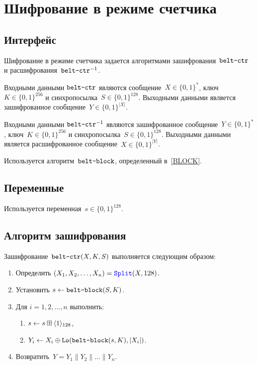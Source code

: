 \section{Шифрование в режиме счетчика}\label{CTR}

\subsection{Интерфейс}\label{CTR.IFace}

Шифрование в режиме счетчика задается алгоритмами 
зашифрования~$\texttt{belt-ctr}$ и расшифрования~$\texttt{belt-ctr}^{-1}$.

Входными данными $\texttt{belt-ctr}$ являются сообщение~$X\in\{0,1\}^*$, 
ключ~$K\in\{0,1\}^{256}$ и синхропосылка~$S\in\{0,1\}^{128}$.
%
Выходными данными является зашифрованное сообщение~$Y\in\{0,1\}^{|X|}$.

Входными данными $\texttt{belt-ctr}^{-1}$ являются зашифрованное 
сообщение~$Y\in\{0,1\}^*$, ключ~$K\in\{0,1\}^{256}$ и 
синхропосылка~$S\in\{0,1\}^{128}$. 
%
Выходными данными является расшифрованное сообщение~$X\in\{0,1\}^{|Y|}$.

Используется алгоритм~$\texttt{belt-block}$, определенный в~\ref{BLOCK}.

\subsection{Переменные}\label{CTR.Vars}

Используется переменная~$s\in\{0,1\}^{128}$.

\subsection{Алгоритм зашифрования}\label{CTR.Encr}

Зашифрование~$\texttt{belt-ctr}(X,K,S)$ выполняется следующим образом:
\begin{enumerate}
\item
Определить $(X_1,X_2,\ldots,X_n)=\mathop{\textcolor{blue}{\texttt{Split}}}\nolimits(X,128)$.
\item
Установить 
$s\leftarrow \texttt{belt-block}(S,K)$.
\item
Для $i=1,2,\ldots,n$ выполнить:
\begin{enumerate}
\item
$s\leftarrow s\boxplus\langle1\rangle_{128}$,
\item
$Y_i\leftarrow X_i\oplus\mathop{\texttt{Lo}}\nolimits(\texttt{belt-block}(s,K),|X_i|)$.
\end{enumerate}
\item
Возвратить~$Y=Y_1\parallel Y_2\parallel\ldots\parallel Y_n$.
\end{enumerate}

